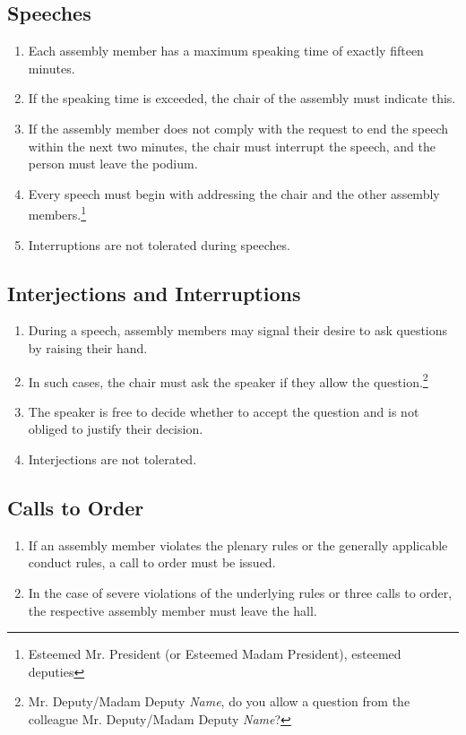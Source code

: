 \documentclass{article}
\begin{document}
\subsection{Speeches}
\begin{enumerate}[(1)]
	\item Each assembly member has a maximum speaking time of exactly fifteen minutes.
	\item If the speaking time is exceeded, the chair of the assembly must indicate this.
	\item If the assembly member does not comply with the request to end the speech within the next two minutes, the chair must interrupt the speech, and the person must leave the podium.
	\item Every speech must begin with addressing the chair and the other assembly members.\footnote{Esteemed Mr. President (or Esteemed Madam President), esteemed deputies}
	\item Interruptions are not tolerated during speeches.
\end{enumerate}

\subsection{Interjections and Interruptions}
\begin{enumerate}[(1)]
	\item During a speech, assembly members may signal their desire to ask questions by raising their hand.
	\item In such cases, the chair must ask the speaker if they allow the question.\footnote{Mr. Deputy/Madam Deputy \textit{Name}, do you allow a question from the colleague Mr. Deputy/Madam Deputy \textit{Name}?}
	\item The speaker is free to decide whether to accept the question and is not obliged to justify their decision.
	\item Interjections are not tolerated.
\end{enumerate}

\subsection{Calls to Order}
\begin{enumerate}[(1)]
	\item If an assembly member violates the plenary rules or the generally applicable conduct rules, a call to order must be issued.
	\item In the case of severe violations of the underlying rules or three calls to order, the respective assembly member must leave the hall.
\end{enumerate}
\end{document}
